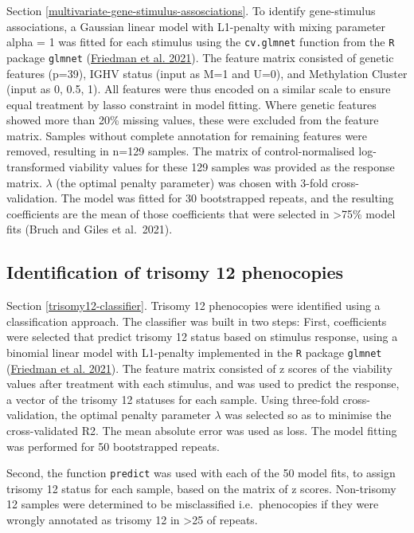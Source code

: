 \documentclass[11pt, a4paper, twosided]{book}
\begin{document}
Section \ref{multivariate-gene-stimulus-assosciations}. To identify gene-stimulus associations, a Gaussian linear model with L1-penalty with mixing parameter alpha = 1 was fitted for each stimulus using the \texttt{cv.glmnet} function from the \texttt{R} package \texttt{glmnet} (\protect\hyperlink{ref-R-glmnet}{Friedman et al. 2021}). The feature matrix consisted of genetic features (p=39), IGHV status (input as M=1 and U=0), and Methylation Cluster (input as 0, 0.5, 1). All features were thus encoded on a similar scale to ensure equal treatment by lasso constraint in model fitting. Where genetic features showed more than 20\% missing values, these were excluded from the feature matrix. Samples without complete annotation for remaining features were removed, resulting in n=129 samples. The matrix of control-normalised log-transformed viability values for these 129 samples was provided as the response matrix. \(\lambda\) (the optimal penalty parameter) was chosen with 3-fold cross-validation. The model was fitted for 30 bootstrapped repeats, and the resulting coefficients are the mean of those coefficients that were selected in \textgreater75\% model fits (Bruch and Giles et al.~2021).

\hypertarget{trisomy12-classifier-method}{%
\subsection{Identification of trisomy 12 phenocopies}\label{trisomy12-classifier-method}}

Section \ref{trisomy12-classifier}. Trisomy 12 phenocopies were identified using a classification approach. The classifier was built in two steps: First, coefficients were selected that predict trisomy 12 status based on stimulus response, using a binomial linear model with L1-penalty implemented in the \texttt{R} package \texttt{glmnet} (\protect\hyperlink{ref-R-glmnet}{Friedman et al. 2021}). The feature matrix consisted of z scores of the viability values after treatment with each stimulus, and was used to predict the response, a vector of the trisomy 12 statuses for each sample. Using three-fold cross-validation, the optimal penalty parameter \(\lambda\) was selected so as to minimise the cross-validated R2. The mean absolute error was used as loss. The model fitting was performed for 50 bootstrapped repeats.

Second, the function \texttt{predict} was used with each of the 50 model fits, to assign trisomy 12 status for each sample, based on the matrix of z scores. Non-trisomy 12 samples were determined to be misclassified i.e.~phenocopies if they were wrongly annotated as trisomy 12 in \textgreater25 of repeats.
\end{document}
